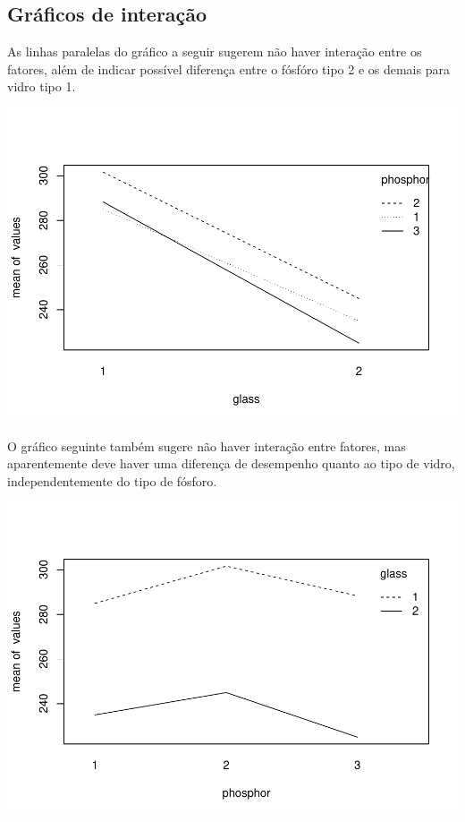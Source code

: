 \documentclass[
]{article}
\begin{document}
\hypertarget{gruxe1ficos-de-interauxe7uxe3o}{%
\subsection{Gráficos de
interação}\label{gruxe1ficos-de-interauxe7uxe3o}}

As linhas paralelas do gráfico a seguir sugerem não haver interação
entre os fatores, além de indicar possível diferença entre o fósfóro
tipo 2 e os demais para vidro tipo 1.

\includegraphics{lista8_files/figure-latex/grafico1-1.pdf}

O gráfico seguinte também sugere não haver interação entre fatores, mas
aparentemente deve haver uma diferença de desempenho quanto ao tipo de
vidro, independentemente do tipo de fósforo.

\includegraphics{lista8_files/figure-latex/grafico2-1.pdf}
\end{document}
